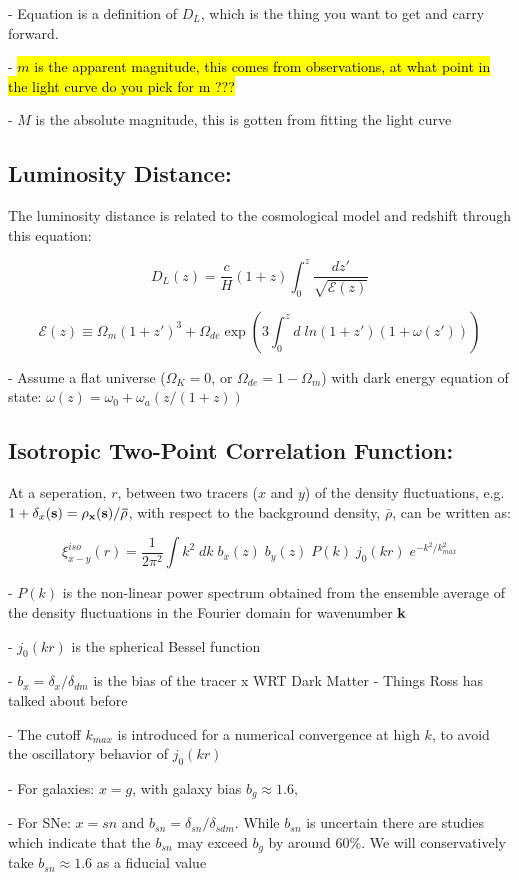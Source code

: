\documentclass{article}
\begin{document}
- Equation is a definition of $D_L$, which is the thing you want to get and carry forward. 

- \hl{$m$ is the apparent magnitude, this comes from observations, at what point in the light curve do you pick for m ???} 

- $M$ is the absolute magnitude, this is gotten from fitting the light curve 

\clearpage
\subsection{Luminosity Distance:}

The luminosity distance is related to the cosmological model and redshift through this equation:

\begin{equation}
D_{L}(z) = \frac{c}{H}(1 + z) \int_{0}^{z} \frac{dz'}{\sqrt{\mathcal{E}(z)}}
\end{equation}

\begin{equation}
\mathcal{E}(z) \equiv \Omega_m(1+z')^3 + \Omega_{de} \exp(3 \int^z_0 d \; ln(1+z')(1+\omega (z')))
\end{equation}

- Assume a flat universe ($\Omega_K = 0$, or $\Omega_{de} = 1 - \Omega_m$) with dark energy equation of state: $\omega(z) = \omega_0 + \omega_a(z/(1+z))$


\subsection{Isotropic Two-Point Correlation Function:}

At a seperation, $r$, between two tracers ($x$ and $y$) of the density fluctuations, e.g. $1+\delta_x(\bf{s}) = \rho_x(\bf{s})/\bar{\rho}$, with respect to the background density, $\bar{\rho}$, can be written as: 

\begin{equation}
\xi^{iso}_{x-y}(r) = \frac{1}{2 \pi^2} \int k^2 \; dk \; b_x(z) \; b_y(z) \; P(k) \; j_0(kr) \; e^{-k^2/k^2_{max}}
\end{equation}

- $P(k)$ is the non-linear power spectrum obtained from the ensemble average of the density fluctuations in the Fourier domain for wavenumber $\bf{k}$

- $j_0(kr)$ is the spherical Bessel function

- $b_x = \delta_x/\delta_{dm}$ is the bias of the tracer x WRT Dark Matter - Things Ross has talked about before

- The cutoff $k_{max}$ is introduced for a numerical convergence at high $k$, to avoid the oscillatory behavior of $j_0(kr)$

- For galaxies: $x = g$, with galaxy bias $b_g \approx 1.6$,

- For SNe: $x = sn$ and $b_{sn} = \delta_{sn}/ \delta_{sdm}$. While $b_{sn}$ is uncertain there are studies which indicate that the $b_{sn}$ may exceed $b_{g}$ by around 60\%. We will conservatively take $b_{sn} \approx 1.6$ as a fiducial value
\end{document}
